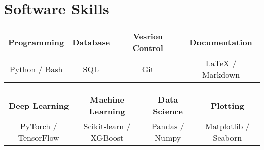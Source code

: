 \documentclass[letterpaper,11pt]{article}
\begin{document}
\section{Software Skills}

\vspace{-10pt}

\begin{table}[h!]
  \begin{center}
    \label{tab:table1}
    \begin{tabular}{c|c|c|c}
      \hspace{5pt} Programming \hspace{5pt} & \hspace{5pt} Database \hspace{5pt} & \hspace{5pt} Vesrion Control \hspace{5pt} & \hspace{15pt} Documentation \hspace{15pt} \\
      \hline
      Python / Bash & SQL & Git & LaTeX / Markdown \\
    \end{tabular}
  \end{center}
\end{table}

\vspace{-20pt}

\begin{table}[h!]
  \begin{center}
    \label{tab:table1}
    \begin{tabular}{c|c|c|c}
      \hspace{20pt} Deep Learning \hspace{20pt} & \hspace{15pt} Machine Learning \hspace{15pt} & \hspace{15pt} Data Science \hspace{15pt} & \hspace{35pt} Plotting \hspace{35pt} \\
      \hline
      PyTorch / TensorFlow & Scikit-learn / XGBoost & Pandas / Numpy & Matplotlib / Seaborn \\
    \end{tabular}
  \end{center}
\end{table}
\end{document}
